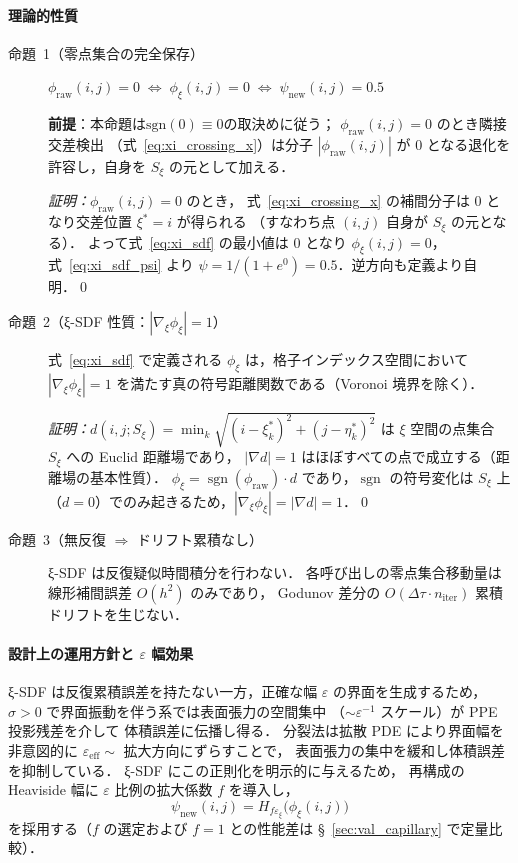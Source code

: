 \paragraph*{理論的性質}

\begin{description}
\item[命題~1（零点集合の完全保存）]
$\phi_{\mathrm{raw}}(i,j) = 0
  \;\Longleftrightarrow\; \phi_\xi(i,j) = 0
  \;\Longleftrightarrow\; \psi_{\mathrm{new}}(i,j) = 0.5$

\textbf{前提}：本命題は\textbf{$\mathrm{sgn}(0)\equiv 0$}の取決めに従う；
$\phi_{\mathrm{raw}}(i,j)=0$ のとき隣接交差検出
（式~\eqref{eq:xi_crossing_x}）は分子 $|\phi_{\mathrm{raw}}(i,j)|$ が
$0$ となる退化を許容し，自身を $S_\xi$ の元として加える．

\textit{証明：}$\phi_{\mathrm{raw}}(i,j)=0$ のとき，
式~\eqref{eq:xi_crossing_x} の補間分子は 0 となり交差位置 $\xi^* = i$ が得られる
（すなわち点 $(i,j)$ 自身が $S_\xi$ の元となる）．
よって式~\eqref{eq:xi_sdf} の最小値は 0 となり $\phi_\xi(i,j) = 0$，
式~\eqref{eq:xi_sdf_psi} より $\psi = 1/(1+e^0) = 0.5$．逆方向も定義より自明．\qed

\item[命題~2（ξ-SDF 性質：$|\nabla_\xi\phi_\xi|=1$）]
式~\eqref{eq:xi_sdf} で定義される $\phi_\xi$ は，格子インデックス空間において
$|\nabla_\xi\phi_\xi|=1$ を満たす真の符号距離関数である（Voronoi 境界を除く）．

\textit{証明：}$d(i,j;S_\xi) = \min_k\sqrt{(i-\xi^*_k)^2+(j-\eta^*_k)^2}$ は
$\xi$ 空間の点集合 $S_\xi$ への Euclid 距離場であり，
$|\nabla d|=1$ はほぼすべての点で成立する（距離場の基本性質）．
$\phi_\xi = \operatorname{sgn}(\phi_{\mathrm{raw}}) \cdot d$ であり，$\operatorname{sgn}$ の符号変化は
$S_\xi$ 上（$d=0$）でのみ起きるため，$|\nabla_\xi\phi_\xi|=|\nabla d|=1$．\qed

\item[命題~3（無反復 $\Rightarrow$ ドリフト累積なし）]
ξ-SDF は反復疑似時間積分を行わない．
各呼び出しの零点集合移動量は線形補間誤差 $O(h^2)$ のみであり，
Godunov 差分の $O(\Delta\tau\cdot n_{\mathrm{iter}})$ 累積ドリフトを生じない．
\end{description}

\paragraph*{設計上の運用方針と $\varepsilon$ 幅効果}
ξ-SDF は反復累積誤差を持たない一方，正確な幅 $\varepsilon$ の界面を生成するため，
$\sigma>0$ で界面振動を伴う系では表面張力の空間集中
（$\sim\varepsilon^{-1}$ スケール）が PPE 投影残差を介して
体積誤差に伝播し得る．
分裂法は拡散 PDE により界面幅を非意図的に
$\varepsilon_{\mathrm{eff}}\sim$ 拡大方向にずらすことで，
表面張力の集中を緩和し体積誤差を抑制している．
ξ-SDF にこの正則化を明示的に与えるため，
再構成の Heaviside 幅に $\varepsilon$ 比例の拡大係数 $f$ を導入し，
\begin{equation}
  \psi_{\mathrm{new}}(i,j) = H_{f\varepsilon_\xi}\!\bigl(\phi_\xi(i,j)\bigr)
  \label{eq:xi_sdf_wide}
\end{equation}
を採用する（$f$ の選定および $f{=}1$ との性能差は
§~\ref{sec:val_capillary} で定量比較）．

